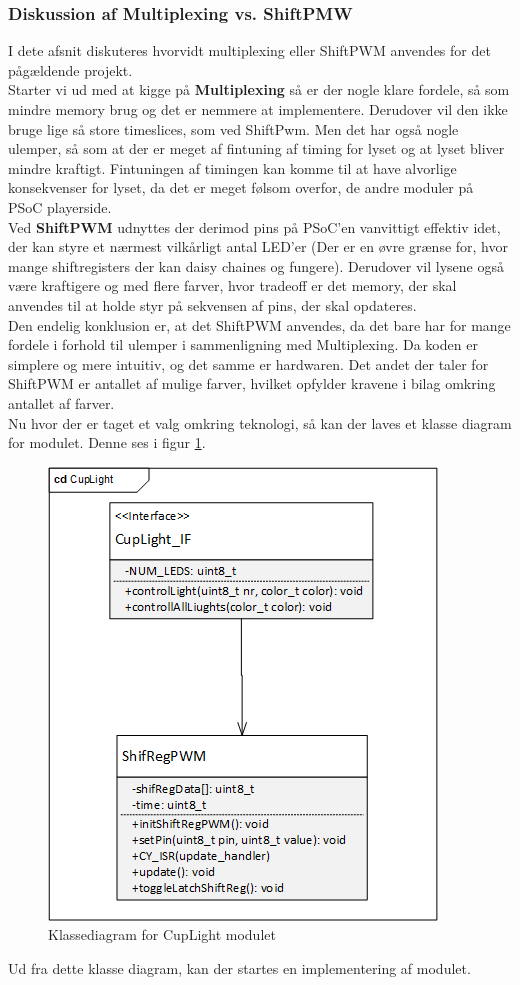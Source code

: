\documentclass[Softwaredesign/Softwaredesign_main.tex]{subfiles}
\begin{document}
\subsubsection{Diskussion af Multiplexing vs. ShiftPMW}
I dete afsnit diskuteres hvorvidt multiplexing eller ShiftPWM anvendes for det pågældende projekt.\\
Starter vi ud med at kigge på \textbf{Multiplexing} så er der nogle klare fordele, så som mindre memory brug og det er nemmere at implementere. Derudover vil den ikke bruge lige så store timeslices, som ved ShiftPwm. Men det har også nogle ulemper, så som at der er meget af fintuning af timing for lyset og at lyset bliver mindre kraftigt. Fintuningen af timingen kan komme til at have alvorlige konsekvenser for lyset, da det er meget følsom overfor, de andre moduler på PSoC playerside.
\\Ved \textbf{ShiftPWM} udnyttes der derimod pins på PSoC'en vanvittigt effektiv idet, der kan styre et nærmest vilkårligt antal LED'er (Der er en øvre grænse for, hvor mange shiftregisters der kan daisy chaines og fungere). Derudover vil lysene også være kraftigere og med flere farver, hvor tradeoff er det memory, der skal anvendes til at holde styr på sekvensen af pins, der skal opdateres.
\\Den endelig konklusion er, at det ShiftPWM anvendes, da det bare har for mange fordele i forhold til ulemper i sammenligning med Multiplexing. Da koden er simplere og mere intuitiv, og det samme er hardwaren. Det andet der taler for ShiftPWM er antallet af mulige farver, hvilket opfylder kravene i bilag  omkring antallet af farver.\\
Nu hvor der er taget et valg omkring teknologi, så kan der laves et klasse diagram for modulet. Denne ses i figur \ref{fig:cd_cuplight}.
\begin{figure}[H]
    \centering
    \includegraphics[width=\textwidth]{Softwaredesign/CupLight_IF/graphics/CD_CupLight.png}
    \caption{Klassediagram for CupLight modulet}
    \label{fig:cd_cuplight}
\end{figure}
Ud fra dette klasse diagram, kan der startes en implementering af modulet.
\end{document}
